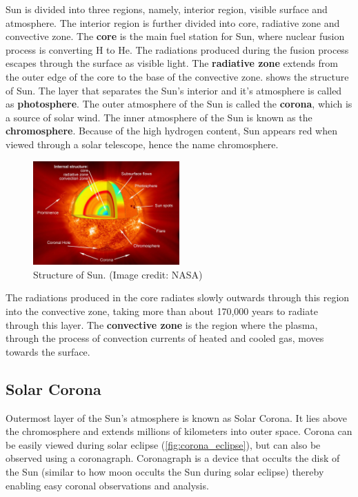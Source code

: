 Sun is divided into three regions, namely, interior region, visible surface and atmosphere. The interior region is further divided into core, radiative zone and convective zone. The \textbf{core} is the main fuel station for Sun, where nuclear fusion process is converting H to He. The radiations produced during the fusion process escapes through the surface as visible light. The \textbf{radiative zone} extends from the outer edge of the core to the base of the convective zone.  shows the structure of Sun. The layer that separates the Sun's interior and it's atmosphere is called as \textbf{photosphere}. The outer atmosphere of the Sun is called the \textbf{corona}, which is a source of solar wind. The inner atmosphere of the Sun is known as the \textbf{chromosphere}. Because of the high hydrogen content, Sun appears red when viewed through a solar telescope, hence the name chromosphere.

\begin{figure}[h!]
    \centering
    \includegraphics[width=0.5\textwidth]{images/structure_of_sun.jpg}
    \caption[Structure of the Sun]{Structure of Sun. (Image credit: NASA)}
    \label{fig:structure_of_sun}
\end{figure}

The radiations produced in the core radiates slowly outwards through this region into the convective zone, taking more than about 170,000 years to radiate through this layer. The \textbf{convective zone} is the region where the plasma, through the process of convection currents of heated and cooled gas, moves towards the surface.

\subsection{Solar Corona}

Outermost layer of the Sun's atmosphere is known as Solar Corona. It lies above the chromosphere and extends millions of kilometers into outer space. Corona can be easily viewed during solar eclipse (\cref{fig:corona_eclipse}), but can also be observed using a coronagraph. Coronagraph is a device that occults the disk of the Sun (similar to how moon occults the Sun during solar eclipse) thereby enabling easy coronal observations and analysis.

